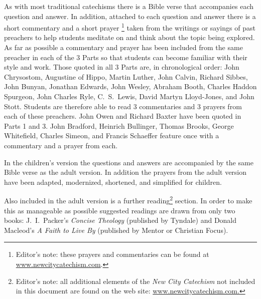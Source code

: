 \documentclass[00-main.tex]{subfiles}
\begin{document}
As with most traditional catechisms there is a Bible verse that accompanies each question and answer. In addition, attached to each question and answer there is a short commentary and a short prayer%
\footnote{Editor's note: these prayers and commentaries can be found at \href{http://www.newcitycatechism.com}{www.newcitycatechism.com}.} %
taken from the writings or sayings of past preachers to help students meditate on and think about the topic being explored. As far as possible a commentary and prayer has been included from the same preacher in each of the 3 Parts so that students can become familiar with their style and work. Those quoted in all 3 Parts are, in chronological order: John Chrysostom, Augustine of Hippo, Martin Luther, John Calvin, Richard Sibbes, John Bunyan, Jonathan Edwards, John Wesley, Abraham Booth, Charles Haddon Spurgeon, John Charles Ryle, C.~S.\ Lewis, David Martyn Lloyd-Jones, and John Stott. Students are therefore able to read 3 commentaries and 3 prayers from each of these preachers. John Owen and Richard Baxter have been quoted in Parts 1 and 3. John Bradford, Heinrich Bullinger, Thomas Brooks, George Whitefield, Charles Simeon, and Francis Schaeffer feature once with a commentary and a prayer from each.

In the children's version the questions and answers are accompanied by the same Bible verse as the adult version. In addition the prayers from the adult version have been adapted, modernized, shortened, and simplified for children.

Also included in the adult version is a further reading\footnote{Editor's note: all additional elements of the \emph{New City Catechism\/} not included in this document are found on the web site: \href{http://www.newcitycatechism.com}{www.newcitycatechism.com.}} section. In order to make this as manageable as possible suggested readings are drawn from only two books: J.~I.\ Packer's \emph{Concise Theology} (published by Tyndale) and Donald Macleod's \emph{A Faith to Live By} (published by Mentor or Christian Focus).
\end{document}
